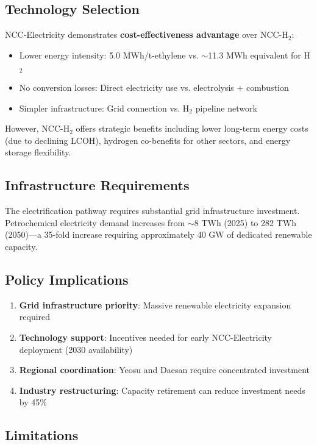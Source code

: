 \documentclass[12pt,a4paper]{article}
\begin{document}
\subsection{Technology Selection}

NCC-Electricity demonstrates \textbf{cost-effectiveness advantage} over NCC-H$_2$:
\begin{itemize}
    \item Lower energy intensity: 5.0 MWh/t-ethylene vs. $\sim$11.3 MWh equivalent for H$_2$
    \item No conversion losses: Direct electricity use vs. electrolysis + combustion
    \item Simpler infrastructure: Grid connection vs. H$_2$ pipeline network
\end{itemize}

However, NCC-H$_2$ offers strategic benefits including lower long-term energy costs (due to declining LCOH), hydrogen co-benefits for other sectors, and energy storage flexibility.

\subsection{Infrastructure Requirements}

The electrification pathway requires substantial grid infrastructure investment. Petrochemical electricity demand increases from $\sim$8 TWh (2025) to 282 TWh (2050)---a 35-fold increase requiring approximately 40 GW of dedicated renewable capacity.

\subsection{Policy Implications}

\begin{enumerate}
    \item \textbf{Grid infrastructure priority}: Massive renewable electricity expansion required
    \item \textbf{Technology support}: Incentives needed for early NCC-Electricity deployment (2030 availability)
    \item \textbf{Regional coordination}: Yeosu and Daesan require concentrated investment
    \item \textbf{Industry restructuring}: Capacity retirement can reduce investment needs by 45\%
\end{enumerate}

\subsection{Limitations}
\end{document}
